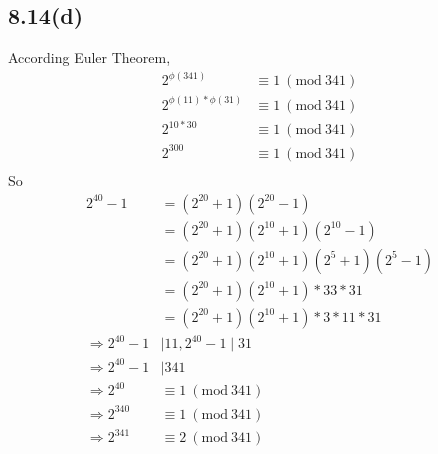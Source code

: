 \documentclass[acmlarge,screen]{acmart}
\begin{document}
\begin{CJK*}{UTF8}{gbsn}
\subsection{8.14(d)}
According Euler Theorem,
\begin{align*}
	2^{\phi(341)}&\equiv1\ (\text{mod}\ 341)\\
	2^{\phi(11) * \phi(31)}&\equiv1\ (\text{mod}\ 341)\\
	2^{10*30}&\equiv1\ (\text{mod}\ 341)\\
	2^{300}&\equiv1\ (\text{mod}\ 341)\\
\end{align*}
So
\begin{align*}
	2^{40}-1&=(2^{20}+1)(2^{20}-1)\\
	&=(2^{20}+1)(2^{10}+1)(2^{10}-1)\\
	&=(2^{20}+1)(2^{10}+1)(2^{5}+1)(2^{5}-1)\\
	&=(2^{20}+1)(2^{10}+1)*33*31\\
	&=(2^{20}+1)(2^{10}+1)*3*11*31\\
	\Rightarrow 2^{40}-1 &\mid 11,  2^{40}-1 \mid 31\\
	\Rightarrow 2^{40}-1 &\mid 341\\
	\Rightarrow 2^{40}&\equiv1\ (\text{mod}\ 341)\\
	\Rightarrow 2^{340}&\equiv1\ (\text{mod}\ 341)\\
	\Rightarrow 2^{341}&\equiv2\ (\text{mod}\ 341)\\
\end{align*}

\end{CJK*}
\end{document}
